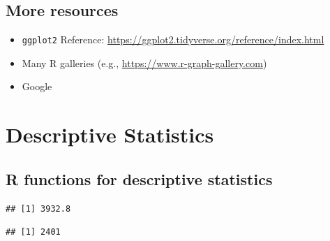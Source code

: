 \documentclass[]{book}
\newenvironment{Shaded}{\begin{snugshade}}{\end{snugshade}}
\newcommand{\KeywordTok}[1]{\textcolor[rgb]{0.13,0.29,0.53}{\textbf{{#1}}}}
\newcommand{\CommentTok}[1]{\textcolor[rgb]{0.56,0.35,0.01}{\textit{{#1}}}}
\newcommand{\NormalTok}[1]{{#1}}
\providecommand{\tightlist}{%
  \setlength{\itemsep}{0pt}\setlength{\parskip}{0pt}}
\begin{document}
\section{More resources}\label{more-resources}

\begin{itemize}
\tightlist
\item
  \texttt{ggplot2} Reference:
  \url{https://ggplot2.tidyverse.org/reference/index.html}
\item
  Many R galleries (e.g., \url{https://www.r-graph-gallery.com})
\item
  Google
\end{itemize}

\chapter{Descriptive Statistics}\label{descriptive-statistics}

\section{R functions for descriptive
statistics}\label{r-functions-for-descriptive-statistics}

\begin{Shaded}
\end{Shaded}

\begin{verbatim}
## [1] 3932.8
\end{verbatim}

\begin{Shaded}
\end{Shaded}

\begin{verbatim}
## [1] 2401
\end{verbatim}

\begin{Shaded}
\end{Shaded}
\end{document}
